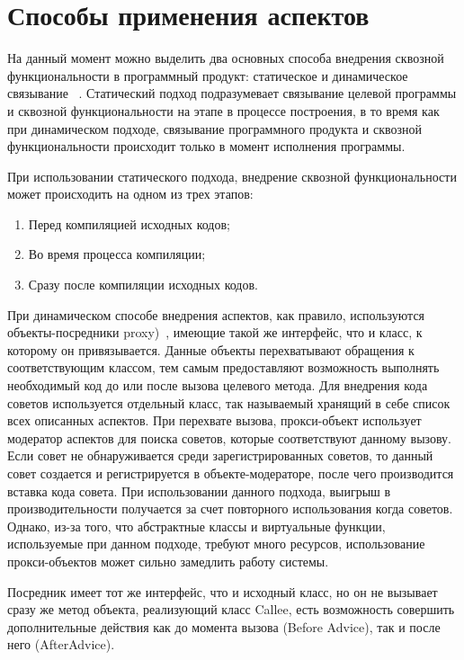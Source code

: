 \section{Способы применения аспектов}
\label{sec:aop_weaving}
На данный момент можно выделить два основных способа внедрения сквозной
функциональности в программный продукт: статическое и динамическое связывание~
\cite{static_and_dynamic_AOP}.
Статический подход подразумевает связывание целевой программы и сквозной
функциональности на этапе в процессе построения, в то время как при динамическом
подходе, связывание программного продукта и сквозной функциональности происходит
только в момент исполнения программы.

При использовании статического подхода, внедрение сквозной функциональности
может происходить на одном из трех этапов:
\begin{enumerate}
  \item Перед компиляцией исходных кодов;
  \item Во время процесса компиляции;
  \item Сразу после компиляции исходных кодов.
\end{enumerate}

При динамическом способе внедрения аспектов, как правило, используются
объекты-посредники proxy)~\cite{aspect_dynamic_weavers}, имеющие такой же
интерфейс, что и класс, к которому он привязывается.
Данные объекты перехватывают обращения к соответствующим классом, тем самым
предоставляют возможность выполнять необходимый код до или после вызова целевого
метода.
Для внедрения кода советов используется отдельный класс, так называемый
 хранящий в себе список всех описанных аспектов.
При перехвате вызова, прокси-объект использует модератор аспектов для поиска
советов, которые соответствуют данному вызову.
Если совет не обнаруживается среди зарегистрированных советов, то данный совет
создается и регистрируется в объекте-модераторе, после чего производится вставка
кода совета.
При использовании данного подхода, выигрыш в производительности получается за
счет повторного использования когда советов.
Однако, из-за того, что абстрактные классы и виртуальные функции, используемые
при данном подходе, требуют много ресурсов, использование прокси-объектов может
сильно замедлить работу системы.

Посредник имеет тот же интерфейс, что и исходный класс, но он не вызывает 
сразу же метод объекта, реализующий класс Callee, есть возможность 
совершить дополнительные действия как до момента вызова (Before Advice), 
так и после него (AfterAdvice).

